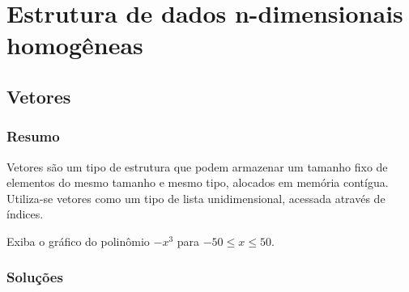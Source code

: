 
\part[Estrutura de dados n-dimensionais homogêneas]
{Estrutura de dados n-dimensionais homogêneas}


\chapter[Vetores]
{Vetores}



\section{Resumo}

Vetores são um tipo de estrutura que podem armazenar um tamanho fixo de elementos do mesmo tamanho e mesmo tipo, alocados em memória contígua. Utiliza-se vetores como um tipo de lista unidimensional, acessada através de índices.


%
%







\begin{problems}
\prob
Exiba o gráfico do polinômio $-x^3$ para $-50 \leq x \leq 50$.
\label{ex:cap02_ex1}
\end{problems}

\section{Soluções}

